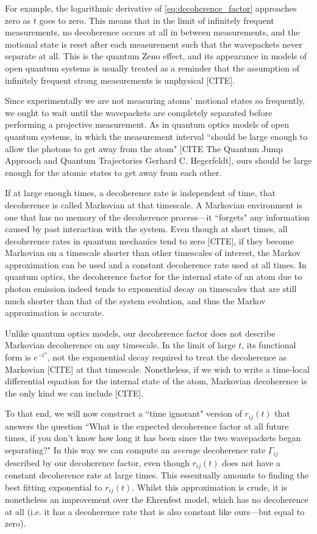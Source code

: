 For example, the logarithmic derivative of \eqref{eq:decoherence_factor} approaches zero as $t$ goes to zero. This means that in the limit of infinitely frequent measurements, no decoherence occurs at all in between measurements, and the motional state is reset after each measurement such that the wavepackets never separate at all. This is the quantum Zeno effect, and its appearance in models of open quantum systems is usually treated as a reminder that the assumption of infinitely frequent strong measurements is unphysical [CITE].

Since experimentally we are not measuring atoms' motional states so frequently, we ought to wait until the wavepackets are completely separated before performing a projective measurement. As in quantum optics models of open quantum systems, in which the measurement interval ``should be large enough to allow the photons to get away from the atom" [CITE The Quantum Jump Approach
and Quantum Trajectories Gerhard C. Hegerfeldt], ours should be large enough for the atomic states to get away from each other.

If at large enough times, a decoherence rate is independent of time, that decoherence is called Markovian at that timescale. A Markovian environment is one that has no memory of the decoherence process---it ``forgets" any information caused by past interaction with the system. Even though at short times, all decoherence rates in quantum mechanics tend to zero [CITE], if they become Markovian on a timescale shorter than other timescales of interest, the Markov approximation can be used and a constant decoherence rate used at all times. In quantum optics, the decoherence factor for the internal state of an atom due to photon emission indeed tends to exponential decay on timescales that are still much shorter than that of the system evolution, and thus the Markov approximation is accurate.

Unlike quantum optics models, our decoherence factor does not describe Markovian decoherence on any timescale. In the limit of large $t$, its functional form is $e^{-t^4}$, not the exponential decay required to treat the decoherence as Markovian [CITE] at that timescale. Nonetheless, if we wish to write a time-local differential equation for the internal state of the atom, Markovian decoherence is the only kind we can include [CITE].

To that end, we will now construct a ``time ignorant" version of $r_{ij}(t)$ that answers the question ``What is the expected decoherence factor at all future times, if you don't know how long it has been since the two wavepackets began separating?" In this way we can compute an \emph{average} decoherence rate $\Gamma_{ij}$ described by our decoherence factor, even though $r_{ij}(t)$ does not have a constant decoherence rate at large times. This essentually amounts to finding the best fitting exponential to $r_{ij}(t)$. Whilst this approximation is crude, it is nonetheless an improvement over the Ehrenfest model, which has no decoherence at all (i.e. it has a decoherence rate that is also constant like ours---but equal to zero).

